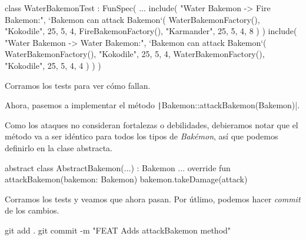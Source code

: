   \begin{kotlin}
    class WaterBakemonTest : FunSpec({
      ...
      include(
        "Water Bakemon -> Fire Bakemon:",
        `Bakemon can attack Bakemon`(
          WaterBakemonFactory(), "Kokodile", 25, 5, 4,
          FireBakemonFactory(), "Karmander", 25, 5, 4, 8
        )
      )
      include(
        "Water Bakemon -> Water Bakemon:",
        `Bakemon can attack Bakemon`(
          WaterBakemonFactory(), "Kokodile", 25, 5, 4,
          WaterBakemonFactory(), "Kokodile", 25, 5, 4, 4
        )
      )
    })
  \end{kotlin}

  Corramos los tests para ver cómo fallan.

  Ahora, pasemos a implementar el método \texttt|Bakemon::attackBakemon(Bakemon)|.

  Como los ataques no consideran fortalezas o debilidades, debieramos notar que el método
  va a ser idéntico para todos los tipos de \textit{Bakémon}, así que podemos definirlo en la
  clase abstracta.

  \begin{kotlin}
    abstract class AbstractBakemon(...) : Bakemon {
      ...
      override fun attackBakemon(bakemon: Bakemon) {
        bakemon.takeDamage(attack)
      }
    }
  \end{kotlin}

  Corramos los tests y veamos que ahora pasan.
  Por útlimo, podemos hacer \textit{commit} de los cambios.

  \begin{kotlin}
    git add .
    git commit -m "FEAT Adds attackBakemon method"
  \end{kotlin}